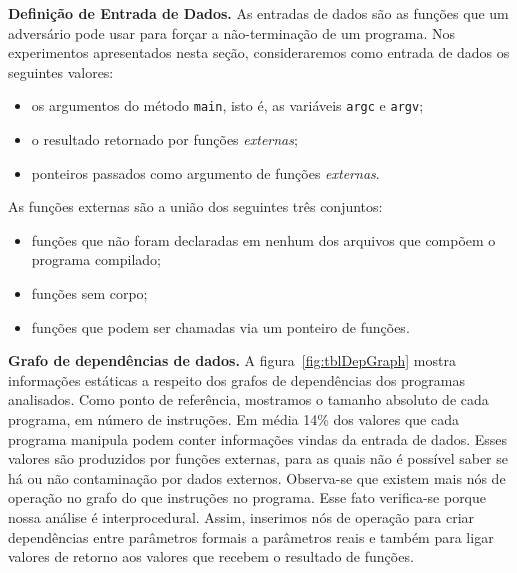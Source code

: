 \documentclass{llncs}
\begin{document}
\noindent
\textbf{Definição de Entrada de Dados.}
As entradas de dados são as funções que um adversário pode usar para forçar
a não-terminação de um programa.
Nos experimentos apresentados nesta seção, consideraremos como entrada de
dados os seguintes valores:
\begin{itemize}
\item os argumentos do método \texttt{main}, isto é, as variáveis \texttt{argc}
e \texttt{argv};
\item o resultado retornado por funções {\em externas};
\item ponteiros passados como argumento de funções {\em externas}.
\end{itemize}
As funções externas são a união dos seguintes três conjuntos:
\begin{itemize}
\item funções que não foram declaradas em nenhum dos arquivos que compõem
o programa compilado;
\item funções sem corpo;
\item funções que podem ser chamadas via um ponteiro de funções.
\end{itemize}

\noindent
\textbf{Grafo de dependências de dados. }
A figura~\ref{fig:tblDepGraph} mostra informações estáticas a respeito dos
grafos de dependências dos programas analisados.
Como ponto de referência, mostramos o tamanho absoluto de cada programa, em
número de  instruções.
Em média 14\% dos valores que cada programa manipula podem
conter informações vindas da entrada de dados.
Esses valores são produzidos por funções externas, para as quais não é
possível saber se há ou não contaminação por dados externos.
Observa-se que existem mais nós de operação no grafo do que instruções no
programa.
Esse fato verifica-se porque nossa análise é interprocedural.
Assim, inserimos nós de operação para criar dependências entre parâmetros
formais a parâmetros reais e também para ligar valores de retorno aos valores
que recebem o resultado de funções.
\end{document}
